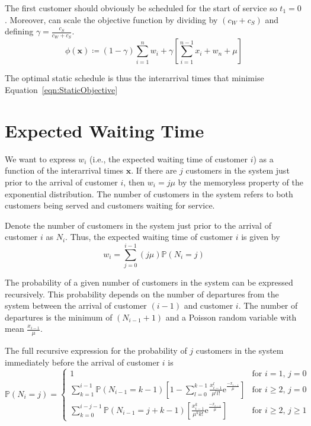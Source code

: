 The first customer should obviously be scheduled for the start of service so $t_{1} = 0$. Moreover, can scale the objective function by dividing by $(c_{W} + c_{S})$ and defining $\gamma = \frac{c_{S}}{c_{W} + c_{S}}$.
\begin{equation}
	\phi (\mathbf{x}) \coloneqq (1 - \gamma) \sum_{i = 1}^{n} w_{i} + \gamma \left[ \sum_{i = 1}^{n - 1} x_{i} + w_{n} + \mu \right]
	\label{eqn:StaticObjective}
\end{equation}

The optimal static schedule is thus the interarrival times that minimise Equation~\ref{eqn:StaticObjective}

\section{Expected Waiting Time}
We want to express $w_{i}$ (i.e., the expected waiting time of customer $i$) as a function of the interarrival times $\mathbf{x}$. If there are $j$ customers in the system just prior to the arrival of customer $i$, then $w_{i} = j \mu$ by the memoryless property of the exponential distribution. The number of customers in the system refers to both customers being served and customers waiting for service.

Denote the number of customers in the system just prior to the arrival of customer $i$ as $N_{i}$. Thus, the expected waiting time of customer $i$ is given by
\begin{equation}
	w_{i} = \sum_{j = 0}^{i - 1} (j \mu) \mathbb{P} (N_{i} = j)
	\label{eqn:StaticWaiting}
\end{equation}

The probability of a given number of customers in the system can be expressed recursively. This probability depends on the number of departures from the system between the arrival of customer $(i - 1)$ and customer $i$. The number of departures is the minimum of $(N_{i - 1} + 1)$ and a Poisson random variable with mean $\frac{x_{i - 1}}{\mu}$.

The full recursive expression for the probability of $j$ customers in the system immediately before the arrival of customer $i$ is
\begin{equation}
	\mathbb{P} (N_{i} = j) = \begin{cases} 1 & \text{for $i = 1$, $j = 0$} \\
	\sum_{k = 1}^{i - 1} \mathbb{P} (N_{i - 1} = k - 1) \left[ 1 - \sum_{l = 0}^{k - 1} \frac{x_{i - 1}^{l}}{\mu^{l} l!} \mathrm{e}^{\frac{- x_{i - 1}}{\mu}}\right] & \text{for $i \geq 2$, $j = 0$} \\
	\sum_{k = 0}^{i - j - 1} \mathbb{P} (N_{i - 1} = j + k - 1) \left[ \frac{x_{i - 1}^{k}}{\mu^{k} k!} \mathrm{e}^{\frac{- x_{i - 1}}{\mu}} \right] & \text{for $i \geq 2$, $j \geq 1$} \end{cases}
	\label{eqn:StaticProbSystem}
\end{equation}

